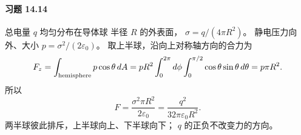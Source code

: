 \paragraph{习题 14.14}
总电量 \(q\) 均匀分布在导体球
半径 \(R\) 的外表面，
\(\sigma=q/(4\pi R^2)\)。
静电压力向外、大小
\(p=\sigma^2/(2\varepsilon_0)\)。
取上半球，沿向上对称轴方向的合力为
\[
 F_z=\int_{\rm hemisphere}p\cos\theta\,dA
 =pR^2\int_0^{2\pi}d\phi
 \int_0^{\pi/2}\cos\theta\sin\theta\,d\theta
 =p\pi R^2.
\]
所以
\[
 \boxed{F=\frac{\sigma^2\pi R^2}{2\varepsilon_0}
 =\frac{q^2}{32\pi\varepsilon_0R^2}}.
\]
两半球彼此排斥，上半球向上、下半球向下；
\(q\) 的正负不改变力的方向。
